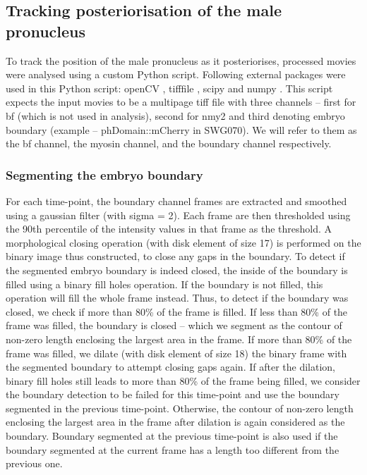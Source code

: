 \subsection{Tracking posteriorisation of the male pronucleus}\label{subsec:nucleusTracking}
To track the position of the male pronucleus as it posteriorises, processed movies were analysed using a custom Python script. Following external packages were used in this Python script: openCV \citep{opencv}, tifffile \citep{tifffile}, scipy \citep{scipy} and numpy \citep{numpy}. This script expects the input movies to be a multipage tiff file with three channels -- first for \ac{bf} (which is not used in analysis), second for \ac{nmy2} and third denoting embryo boundary (example -- phDomain::mCherry in SWG070). We will refer to them as the \ac{bf} channel, the myosin channel, and the boundary channel respectively.

\subsubsection{Segmenting the embryo boundary}\label{subsubsec:boundaryDetect}
For each time-point, the boundary channel frames are extracted and smoothed using a gaussian filter (with sigma = \SI{2}{\pixels}). Each frame are then thresholded using the 90th percentile of the intensity values in that frame as the threshold. A morphological closing operation (with disk element of size \SI{17}{\pixels}) is performed on the binary image thus constructed, to close any gaps in the boundary. To detect if the segmented embryo boundary is indeed closed, the inside of the boundary is filled using a binary fill holes operation. If the boundary is not filled, this operation will fill the whole frame instead. Thus, to detect if the boundary was closed, we check if more than \num{80}\% of the frame is filled. If less than \num{80}\% of the frame was filled, the boundary is closed -- which we segment as the contour of non-zero length enclosing the largest area in the frame. If more than \num{80}\% of the frame was filled, we dilate (with disk element of size \SI{18}{\pixels}) the binary frame with the segmented boundary to attempt closing gaps again. If after the dilation, binary fill holes still leads to more than \num{80}\% of the frame being filled, we consider the boundary detection to be failed for this time-point and use the boundary segmented in the previous time-point. Otherwise, the contour of non-zero length enclosing the largest area in the frame after dilation is again considered as the boundary. Boundary segmented at the previous time-point is also used if the boundary segmented at the current frame has a length too different from the previous one.

